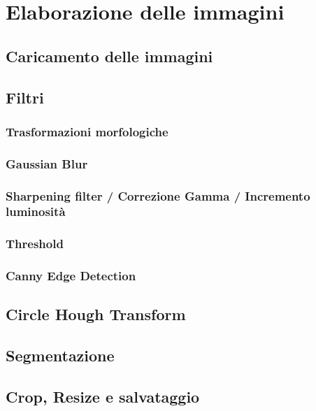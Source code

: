 \documentclass[12pt,twoside,openright]{report}
\begin{document}
  \chapter{Elaborazione delle immagini}
  
  \section{Caricamento delle immagini}
  
  \section{Filtri}
  
  \subsection{Trasformazioni morfologiche}
  
  \subsection{Gaussian Blur}
  
  \subsection{Sharpening filter / Correzione Gamma / Incremento luminosità}
  
  \subsection{Threshold}
  
  \subsection{Canny Edge Detection}
  
  \section{Circle Hough Transform}
  
  \section{Segmentazione}
  
  \section{Crop, Resize e salvataggio}
  
  
\end{document}
